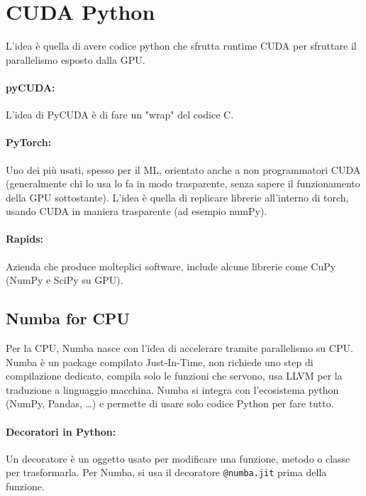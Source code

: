 
\section{CUDA Python}

L'idea è quella di avere codice python che sfrutta runtime CUDA per sfruttare il parallelismo esposto dalla GPU.

\paragraph{pyCUDA:} L'idea di PyCUDA è di fare un "wrap" del codice C.

\paragraph{PyTorch:} Uno dei più usati, spesso per il ML, orientato anche a non programmatori CUDA (generalmente chi lo usa lo fa in modo trasparente, senza sapere il funzionamento della GPU sottostante). L'idea è quella di replicare librerie all'interno di torch, usando CUDA in maniera trasparente (ad esempio numPy).

\paragraph{Rapids:} Azienda che produce molteplici software, include alcune librerie come CuPy (NumPy e SciPy su GPU). 

\subsection{Numba for CPU}

Per la CPU, Numba nasce con l'idea di accelerare tramite parallelismo su CPU.  Numba è un package compilato Just-In-Time, non richiede uno step di compilazione dedicato, compila solo le funzioni che servono, usa LLVM per la traduzione a linguaggio macchina. Numba si integra con l'ecosistema python (NumPy, Pandas, \dots) e permette di usare solo codice Python per fare tutto.

\paragraph{Decoratori in Python:} Un decoratore è un oggetto usato per modificare una funzione, metodo o classe per trasformarla. Per Numba, si usa il decoratore \texttt{@numba.jit} prima della funzione. 

